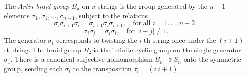 The \emph{Artin braid group} $B_n$ on $n$ strings is the group generated by the $n-1$ elements $\sigma_1, \sigma_2, \ldots, \sigma_{n-1}$, subject to the relations
$$
\sigma_i \sigma_{i+1} \sigma_i = \sigma_{i+1} \sigma_i \sigma_{i+1}, \quad \text{for all } i = 1, \ldots, n-2,
$$
$$
\sigma_i \sigma_j = \sigma_j \sigma_i, \quad \text{for } |i-j| \neq 1.
$$
The generator $\sigma_i$ corresponds to twisting the $i$-th string once under the $(i+1)$-st string. The braid group $B_2$ is the infinite cyclic group on the single generator $\sigma_1$. There is a canonical surjective homomorphism $B_n \twoheadrightarrow S_n$ onto the symmetric group, sending each $\sigma_i$ to the transposition $\tau_i = (i\; i+1)$.
